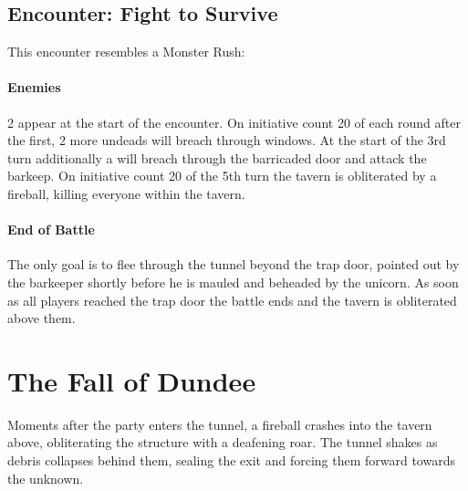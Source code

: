 \subsection*{Encounter: Fight to Survive}
{\entryfont This encounter resembles a Monster Rush:
\paragraph*{Enemies} 2 \hyperref[monster:UndeadSoldier]{} appear at the start of the encounter. On initiative count 20 of each round after the first, 2 more undeads will breach through windows. At the start of the 3rd turn additionally a \hyperref[monster:CorruptedUnicorn]{} will breach through the barricaded door and attack the barkeep. On initiative count 20 of the 5th turn the tavern is obliterated by a fireball, killing everyone within the tavern.
\paragraph*{End of Battle} The only goal is to flee through the tunnel beyond the trap door, pointed out by the barkeeper shortly before he is mauled and beheaded by the unicorn. As soon as all players reached the trap door the battle ends and the tavern is obliterated above them.}

\section*{The Fall of Dundee}
{\entryfont Moments after the party enters the tunnel, a fireball crashes into the tavern above, obliterating the structure with a deafening roar. The tunnel shakes as debris collapses behind them, sealing the exit and forcing them forward towards the unknown.}

